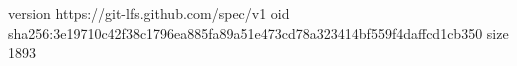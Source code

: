 version https://git-lfs.github.com/spec/v1
oid sha256:3e19710c42f38c1796ea885fa89a51e473cd78a323414bf559f4daffcd1cb350
size 1893
